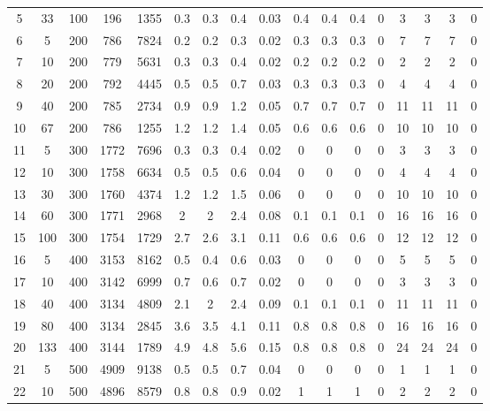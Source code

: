 \documentclass[11pt]{article}
\newcommand{\np}{\newpage}
\begin{document}
\begin{landscape}
\begin{longtable}[c]{ccccc|cccc|cccc|cccc}
		\rowcolor[HTML]{EFEFEF} 
		5 & 33 & 100 & 196 & 1355 & 0.3 & 0.3 & 0.4 & 0.03 & 0.4 & 0.4 & 0.4 & 0 & 3 & 3 & 3 & 0 \\
		6 & 5 & 200 & 786 & 7824 & 0.2 & 0.2 & 0.3 & 0.02 & 0.3 & 0.3 & 0.3 & 0 & 7 & 7 & 7 & 0 \\
		7 & 10 & 200 & 779 & 5631 & 0.3 & 0.3 & 0.4 & 0.02 & 0.2 & 0.2 & 0.2 & 0 & 2 & 2 & 2 & 0 \\
		8 & 20 & 200 & 792 & 4445 & 0.5 & 0.5 & 0.7 & 0.03 & 0.3 & 0.3 & 0.3 & 0 & 4 & 4 & 4 & 0 \\
		9 & 40 & 200 & 785 & 2734 & 0.9 & 0.9 & 1.2 & 0.05 & 0.7 & 0.7 & 0.7 & 0 & 11 & 11 & 11 & 0 \\
		10 & 67 & 200 & 786 & 1255 & 1.2 & 1.2 & 1.4 & 0.05 & 0.6 & 0.6 & 0.6 & 0 & 10 & 10 & 10 & 0 \\
		\rowcolor[HTML]{EFEFEF} 
		11 & 5 & 300 & 1772 & 7696 & 0.3 & 0.3 & 0.4 & 0.02 & 0 & 0 & 0 & 0 & 3 & 3 & 3 & 0 \\
		\rowcolor[HTML]{EFEFEF} 
		12 & 10 & 300 & 1758 & 6634 & 0.5 & 0.5 & 0.6 & 0.04 & 0 & 0 & 0 & 0 & 4 & 4 & 4 & 0 \\
		\rowcolor[HTML]{EFEFEF} 
		13 & 30 & 300 & 1760 & 4374 & 1.2 & 1.2 & 1.5 & 0.06 & 0 & 0 & 0 & 0 & 10 & 10 & 10 & 0 \\
		\rowcolor[HTML]{EFEFEF} 
		14 & 60 & 300 & 1771 & 2968 & 2 & 2 & 2.4 & 0.08 & 0.1 & 0.1 & 0.1 & 0 & 16 & 16 & 16 & 0 \\
		\rowcolor[HTML]{EFEFEF} 
		15 & 100 & 300 & 1754 & 1729 & 2.7 & 2.6 & 3.1 & 0.11 & 0.6 & 0.6 & 0.6 & 0 & 12 & 12 & 12 & 0 \\
		16 & 5 & 400 & 3153 & 8162 & 0.5 & 0.4 & 0.6 & 0.03 & 0 & 0 & 0 & 0 & 5 & 5 & 5 & 0 \\
		17 & 10 & 400 & 3142 & 6999 & 0.7 & 0.6 & 0.7 & 0.02 & 0 & 0 & 0 & 0 & 3 & 3 & 3 & 0 \\
		18 & 40 & 400 & 3134 & 4809 & 2.1 & 2 & 2.4 & 0.09 & 0.1 & 0.1 & 0.1 & 0 & 11 & 11 & 11 & 0 \\
		19 & 80 & 400 & 3134 & 2845 & 3.6 & 3.5 & 4.1 & 0.11 & 0.8 & 0.8 & 0.8 & 0 & 16 & 16 & 16 & 0 \\
		20 & 133 & 400 & 3144 & 1789 & 4.9 & 4.8 & 5.6 & 0.15 & 0.8 & 0.8 & 0.8 & 0 & 24 & 24 & 24 & 0 \\ \np
		\rowcolor[HTML]{EFEFEF} 
		21 & 5 & 500 & 4909 & 9138 & 0.5 & 0.5 & 0.7 & 0.04 & \cellcolor[HTML]{EFEFEF}0 & 0 & 0 & 0 &1 & 1 & 1 & 0 \\
		\rowcolor[HTML]{EFEFEF} 
		22 & 10 & 500 & 4896 & 8579 & 0.8 & 0.8 & 0.9 & 0.02 & 1 & 1 & 1 & 0 & 2 & 2 & 2 & 0 \\

\end{longtable}
\end{landscape}
\end{document}
